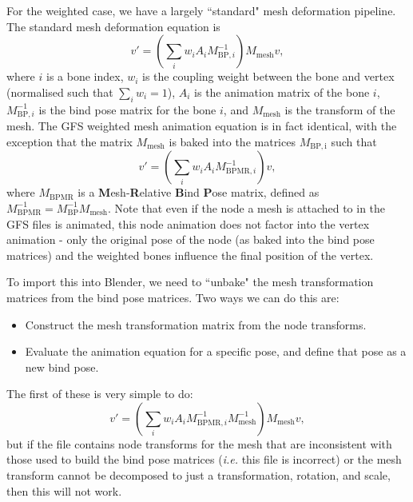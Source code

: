 \documentclass{article}
\begin{document}
For the weighted case, we have a largely ``standard" mesh deformation pipeline. The standard mesh deformation equation is
\begin{equation}
v' = \left( \sum_i w_i A_i M_{\mathrm{BP}, i}^{-1} \right) M_\mathrm{mesh} v,
\end{equation}
where $i$ is a bone index, $w_i$ is the coupling weight between the bone and vertex (normalised such that $\sum_i w_i = 1$), $A_i$ is the animation matrix of the bone $i$, $M_{\mathrm{BP}, i}^{-1}$ is the bind pose matrix for the bone $i$, and $M_\mathrm{mesh}$ is the transform of the mesh. The GFS weighted mesh animation equation is in fact identical, with the exception that the matrix $M_\mathrm{mesh}$ is baked into the matrices $M_\mathrm{BP, i}$ such that
\begin{equation}
v' = \left( \sum_i w_i A_i M_{\mathrm{BPMR}, i}^{-1} \right) v,
\end{equation}
where $M_{\mathrm{BPMR}}$ is a \textbf{M}esh-\textbf{R}elative \textbf{B}ind \textbf{P}ose matrix, defined as $M_{\mathrm{BPMR}}^{-1} = M_\mathrm{BP}^{-1} M_\mathrm{mesh}$. Note that even if the node a mesh is attached to in the GFS files is animated, this node animation does not factor into the vertex animation - only the original pose of the node (as baked into the bind pose matrices) and the weighted bones influence the final position of the vertex.

To import this into Blender, we need to ``unbake" the mesh transformation matrices from the bind pose matrices. Two ways we can do this are:
\begin{itemize}
\item Construct the mesh transformation matrix from the node transforms.
\item Evaluate the animation equation for a specific pose, and define that pose as a new bind pose.
\end{itemize}

The first of these is very simple to do:
\begin{equation}
v' = \left( \sum_i w_i A_i M_{\mathrm{BPMR}, i}^{-1} M_{\mathrm{mesh}}^{-1} \right)  M_{\mathrm{mesh}} v,
\end{equation}
but if the file contains node transforms for the mesh that are inconsistent with those used to build the bind pose matrices (\textit{i.e.} this file is incorrect) or the mesh transform cannot be decomposed to just a transformation, rotation, and scale, then this will not work.
\end{document}
